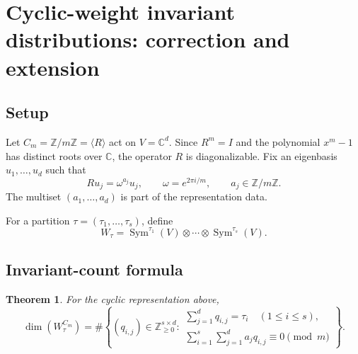 \documentclass[10pt]{article}
\newcommand{\Sym}{\operatorname{Sym}}
\newcommand{\C}{\mathbb C}
\newcommand{\Z}{\mathbb Z}
\newtheorem{theorem}{Theorem}
\begin{document}
\clearpage
\section{Cyclic-weight invariant distributions: correction and extension}\label{proof:cyclic-weight}
\begingroup
{}
\providecommand{\C}{\mathbb C}
\renewcommand{\C}{\mathbb C}
\providecommand{\Z}{\mathbb Z}
\renewcommand{\Z}{\mathbb Z}
\providecommand{\Sym}{\operatorname{Sym}}
\renewcommand{\Sym}{\operatorname{Sym}}
\providecommand{\Exp}{\operatorname{Exp}}
\renewcommand{\Exp}{\operatorname{Exp}}
\setcounter{theorem}{0}
\setcounter{proposition}{0}
\setcounter{lemma}{0}
\setcounter{corollary}{0}
\setcounter{remark}{0}
\begin{abstract}
This note verifies the homogeneous-basis moments associated with a finite
cyclic representation. The answer depends on the multiset of weights of the
chosen representation, not only on the abstract cyclic group. We prove the
weight-congruence formula, derive its refined Molien series, specialize to the
cyclic permutation representation, and describe independent exact and
numerical tests implemented in the accompanying marimo notebook.
\end{abstract}

\subsection{Setup}

Let $C_m=\Z/m\Z=\langle R\rangle$ act on $V=\C^d$. Since $R^m=I$ and the
polynomial $x^m-1$ has distinct roots over $\C$, the operator $R$ is
diagonalizable. Fix an eigenbasis $u_1,\ldots,u_d$ such that
\[
  Ru_j=\omega^{a_j}u_j,
  \qquad \omega=e^{2\pi i/m},
  \qquad a_j\in\Z/m\Z.
\]
The multiset $(a_1,\ldots,a_d)$ is part of the representation data.

For a partition $\tau=(\tau_1,\ldots,\tau_s)$, define
\[
  W_\tau=\Sym^{\tau_1}(V)\otimes\cdots\otimes\Sym^{\tau_s}(V).
\]

\subsection{Invariant-count formula}

\begin{theorem}\label{cyclic-weight-distribution-proof:thm:count}
For the cyclic representation above,
\[
\dim(W_\tau^{C_m})=
\#\left\{
(q_{i,j})\in\Z_{\geq0}^{s\times d}:
\begin{array}{l}
\sum_{j=1}^{d}q_{i,j}=\tau_i\quad(1\leq i\leq s),\\[2pt]
\sum_{i=1}^{s}\sum_{j=1}^{d}a_jq_{i,j}\equiv0\pmod m
\end{array}
\right\}.
\]
\end{theorem}
\end{document}
